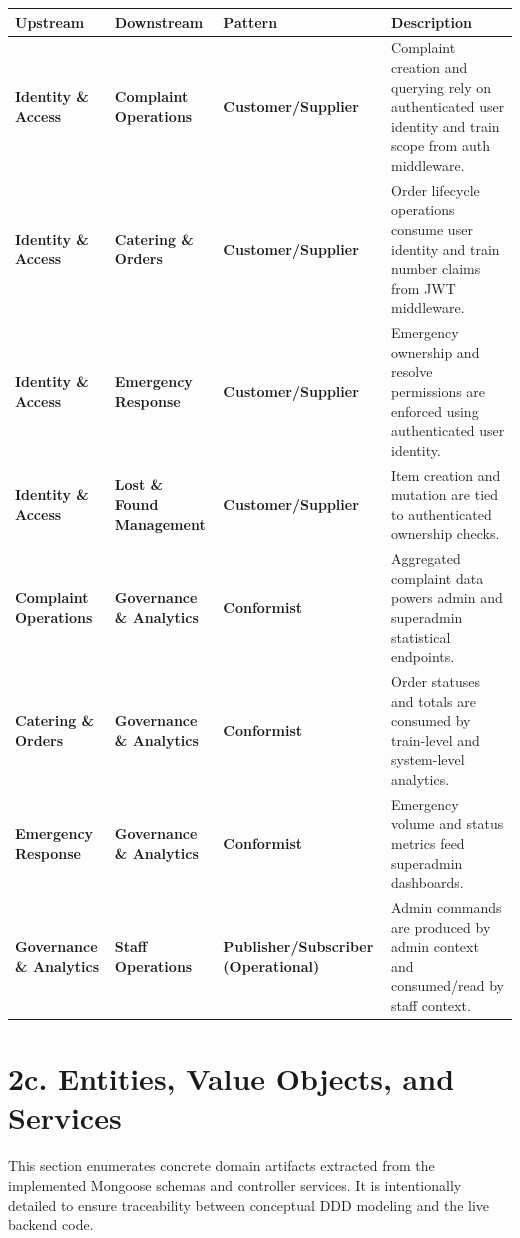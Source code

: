 \documentclass[12pt,a4paper]{report}
\renewcommand{\toprule}{\hline\hline}
\renewcommand{\midrule}{\hline}
\renewcommand{\bottomrule}{\hline\hline}
\begin{document}
\begin{table}[H]
\centering
\begin{tabularx}{\textwidth}{>{\bfseries}p{} >{\bfseries}p{} >{\bfseries}p{} Y}
\toprule
{}
\textcolor{TableHeaderText}{Upstream} & \textcolor{TableHeaderText}{Downstream} & \textcolor{TableHeaderText}{Pattern} & \textcolor{TableHeaderText}{Description} \\
\midrule
Identity \& Access & Complaint Operations & Customer/Supplier & Complaint creation and querying rely on authenticated user identity and train scope from auth middleware. \\
Identity \& Access & Catering \& Orders & Customer/Supplier & Order lifecycle operations consume user identity and train number claims from JWT middleware. \\
Identity \& Access & Emergency Response & Customer/Supplier & Emergency ownership and resolve permissions are enforced using authenticated user identity. \\
Identity \& Access & Lost \& Found Management & Customer/Supplier & Item creation and mutation are tied to authenticated ownership checks. \\
Complaint Operations & Governance \& Analytics & Conformist & Aggregated complaint data powers admin and superadmin statistical endpoints. \\
Catering \& Orders & Governance \& Analytics & Conformist & Order statuses and totals are consumed by train-level and system-level analytics. \\
Emergency Response & Governance \& Analytics & Conformist & Emergency volume and status metrics feed superadmin dashboards. \\
Governance \& Analytics & Staff Operations & Publisher/Subscriber (Operational) & Admin commands are produced by admin context and consumed/read by staff context. \\
\bottomrule
\end{tabularx}
\end{table}

\section{2c. Entities, Value Objects, and Services}

This section enumerates concrete domain artifacts extracted from the implemented Mongoose schemas and controller services. It is intentionally detailed to ensure traceability between conceptual DDD modeling and the live backend code.
\end{document}
